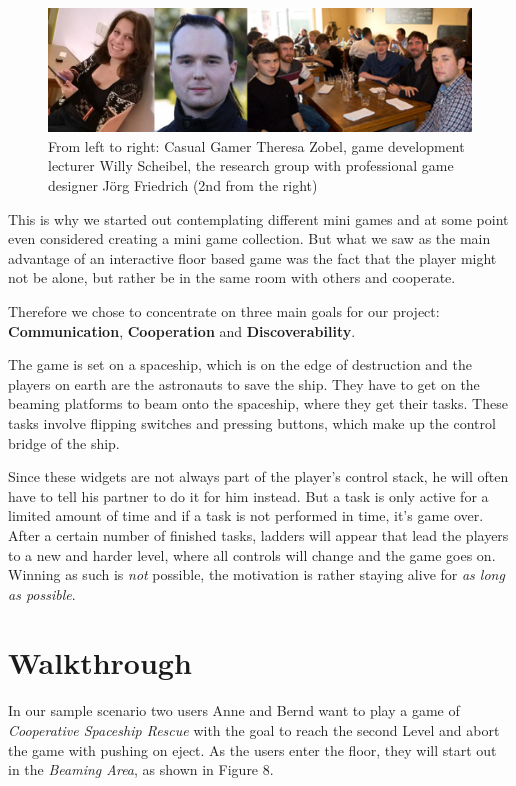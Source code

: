 \documentclass{sigchi}
\begin{document}
\begin{figure}[h]
\centering
\includegraphics[width=0.8\columnwidth]{leute}
\caption{From left to right: Casual Gamer Theresa Zobel, game development lecturer Willy Scheibel, the research group with professional game designer  J\"org Friedrich (2nd from the right)}
\label{fig:beamingArea}
\end{figure}
\pagebreak
This is why we started out contemplating different mini games and at some point even considered creating a mini game collection. But what we saw as the main advantage of an interactive floor based game was the fact that the player might not be alone, but rather be in the same room with others and cooperate. 

Therefore we chose to concentrate on three main goals for our project: \textbf{Communication}, \textbf{Cooperation} and \textbf{Discoverability}.





The game is set on a spaceship, which is on the edge of destruction and the players on earth are the astronauts to save the ship. They have to get on the beaming platforms to beam onto the spaceship, where they get their tasks. These tasks involve flipping switches and pressing buttons, which make up the control bridge of the ship. 

Since these widgets are not always part of the player's control stack, he will often have to tell his partner to do it for him instead. But a task is only active for a limited amount of time and if a task is not performed in time, it's game over. \newline
After a certain number of finished tasks, ladders will appear that lead the players to a new and harder level, where all controls will change and the game goes on. Winning as such is \textit{not} possible, the motivation is rather staying alive for  \textit{as long as possible}.
\section{Walkthrough}
\vspace{1mm}
In our sample scenario two users Anne and Bernd want to play a game of \textit{Cooperative Spaceship Rescue} with the goal to reach the second Level and abort the game with pushing on eject. As the users enter the floor, they will start out in the \textit{Beaming Area}, as shown in Figure 8.
\end{document}
